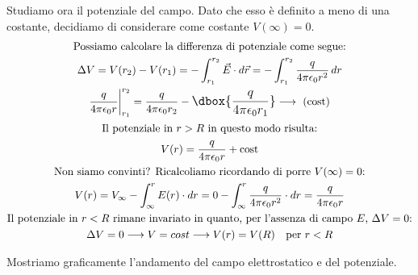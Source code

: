 \documentclass[a4paper,12pt,titlepage,openany]{book}
\theoremstyle{mydef}
\newcommand\dboxed[1]{\mathlarger{\dbox{\ensuremath{#1}}}}  %
\begin{document}
            \bigskip
            Studiamo ora il potenziale del campo. Dato che esso è definito a meno di una costante, decidiamo di considerare come costante $V(\infty) = 0$.
            \begin{gather*}
                \text{Possiamo calcolare la differenza di potenziale come segue:}\\
                \Delta V = V(r_2) - V(r_1) = -\int_{r_1}^{r_2} \vec{E}\cdot\mathop{d\vec{r}} = -\int_{r_1}^{r_2}\frac{q}{4\pi\epsilon_0 r^2}\mathop{dr}\\
                \frac{q}{4\pi\epsilon_0 r}\bigg|_{r_1}^{r_2} = \frac{q}{4\pi\epsilon_0 r_2} - \dboxed{\frac{q}{4\pi\epsilon_0 r_1}}\longrightarrow\mbox{ (cost)} \\
                \text{Il potenziale in $r > R$ in questo modo risulta:}\\
                V(r) = \frac{q}{4\pi\epsilon_0 r} + \mbox{cost}\\
                \text{Non siamo convinti? Ricalcoliamo ricordando di porre $V(\infty) = 0$:}\\
                V(r) = V_\infty -\int_{\infty}^{r}E(r)\cdot\mathop{dr} = 0 - \int_{\infty}^{r}\frac{q}{4\pi\epsilon_0 r^2}\cdot\mathop{dr}=\frac{q}{4\pi\epsilon_0 r}\\
                \text{Il potenziale in $r<R$ rimane invariato in quanto, per l'assenza di campo $E$, $\Delta V = 0$:}\\
                \Delta V = 0 \longrightarrow V = cost \longrightarrow V(r) = V(R) \quad\mbox{per } r<R
            \end{gather*}
            
            \noindent
            Mostriamo graficamente l'andamento del campo elettrostatico e del potenziale.\\
            
\end{document}
